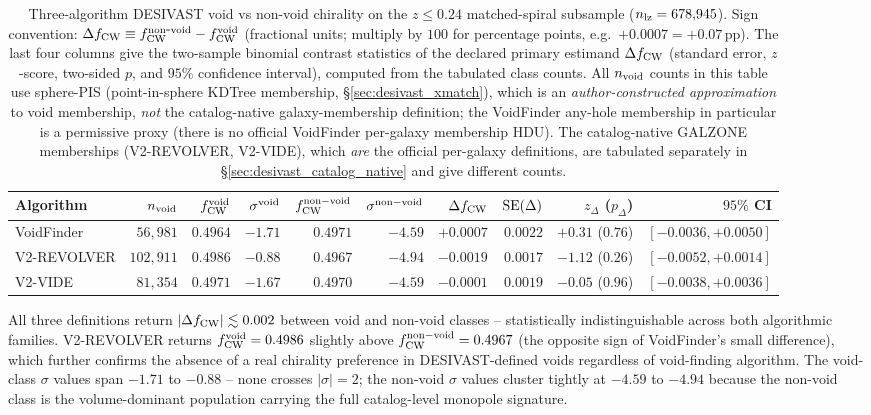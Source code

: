 \documentclass[aps,prd,twocolumn,superscriptaddress,showpacs,preprintnumbers,nofootinbib,longbibliography,floatfix]{revtex4-2}
\begin{document}
\begin{table}[ht]
\caption{Three-algorithm DESIVAST void vs non-void chirality on the
$z \leq 0.24$ matched-spiral subsample ($n_{\rm lz} = 678{,}945$).
Sign convention: $\Delta f_{\rm CW} \equiv f_{\rm CW}^{\rm non\mbox{-}void}
- f_{\rm CW}^{\rm void}$ (fractional units; multiply by $100$ for
percentage points, e.g.\ $+0.0007 = +0.07$\,pp). The last four columns give the two-sample
binomial contrast statistics of the declared primary estimand
$\Delta f_{\rm CW}$ (standard error, $z$-score, two-sided $p$, and
$95\%$ confidence interval), computed from the tabulated class counts.
All $n_{\rm void}$ counts in this table use sphere-PIS
(point-in-sphere KDTree membership, \S\ref{sec:desivast_xmatch}), which is
an \emph{author-constructed approximation} to void membership, \emph{not}
the catalog-native galaxy-membership definition; the VoidFinder any-hole
membership in particular is a permissive proxy (there is no official
VoidFinder per-galaxy membership HDU). The catalog-native GALZONE
memberships (V2-REVOLVER, V2-VIDE), which \emph{are} the official
per-galaxy definitions, are tabulated separately in
\S\ref{sec:desivast_catalog_native} and give different counts.}
\label{tab:desivast_three_algo}
\begin{ruledtabular}
\begin{tabular}{lrrrrrrrrr}
Algorithm & $n_{\rm void}$ & $f_{\rm CW}^{\rm void}$ &
$\sigma^{\rm void}$ & $f_{\rm CW}^{\rm non-void}$ &
$\sigma^{\rm non-void}$ & $\Delta f_{\rm CW}$ & ${\rm SE}(\Delta)$ &
$z_\Delta$ ($p_\Delta$) & $95\%$ CI \\
\hline
VoidFinder   & $56{,}981$  & $0.4964$ & $-1.71$ & $0.4971$ & $-4.59$ & $+0.0007$ & $0.0022$ & $+0.31$ ($0.76$) & $[-0.0036, +0.0050]$ \\
V2-REVOLVER  & $102{,}911$ & $0.4986$ & $-0.88$ & $0.4967$ & $-4.94$ & $-0.0019$ & $0.0017$ & $-1.12$ ($0.26$) & $[-0.0052, +0.0014]$ \\
V2-VIDE      & $81{,}354$  & $0.4971$ & $-1.67$ & $0.4970$ & $-4.59$ & $-0.0001$ & $0.0019$ & $-0.05$ ($0.96$) & $[-0.0038, +0.0036]$ \\
\end{tabular}
\end{ruledtabular}
\end{table}

All three definitions return $|\Delta f_{\rm CW}| \lesssim 0.002$ between
void and non-void classes -- statistically indistinguishable across both
algorithmic families. V2-REVOLVER returns
$f_{\rm CW}^{\rm void} = 0.4986$ slightly above $f_{\rm CW}^{\rm
non-void} = 0.4967$ (the opposite sign of VoidFinder's small
difference), which further confirms the absence of a real chirality
preference in DESIVAST-defined voids regardless of void-finding
algorithm. The void-class $\sigma$ values span $-1.71$ to $-0.88$ --
none crosses $|\sigma| = 2$; the non-void $\sigma$ values cluster
tightly at $-4.59$ to $-4.94$ because the non-void class is the
volume-dominant population carrying the full catalog-level monopole
signature.
\end{document}
